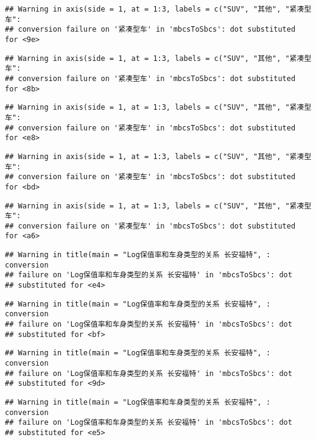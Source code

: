 \documentclass[]{article}
\begin{document}
\begin{verbatim}
## Warning in axis(side = 1, at = 1:3, labels = c("SUV", "其他", "紧凑型车":
## conversion failure on '紧凑型车' in 'mbcsToSbcs': dot substituted for <9e>
\end{verbatim}

\begin{verbatim}
## Warning in axis(side = 1, at = 1:3, labels = c("SUV", "其他", "紧凑型车":
## conversion failure on '紧凑型车' in 'mbcsToSbcs': dot substituted for <8b>
\end{verbatim}

\begin{verbatim}
## Warning in axis(side = 1, at = 1:3, labels = c("SUV", "其他", "紧凑型车":
## conversion failure on '紧凑型车' in 'mbcsToSbcs': dot substituted for <e8>
\end{verbatim}

\begin{verbatim}
## Warning in axis(side = 1, at = 1:3, labels = c("SUV", "其他", "紧凑型车":
## conversion failure on '紧凑型车' in 'mbcsToSbcs': dot substituted for <bd>
\end{verbatim}

\begin{verbatim}
## Warning in axis(side = 1, at = 1:3, labels = c("SUV", "其他", "紧凑型车":
## conversion failure on '紧凑型车' in 'mbcsToSbcs': dot substituted for <a6>
\end{verbatim}

\begin{verbatim}
## Warning in title(main = "Log保值率和车身类型的关系 长安福特", : conversion
## failure on 'Log保值率和车身类型的关系 长安福特' in 'mbcsToSbcs': dot
## substituted for <e4>
\end{verbatim}

\begin{verbatim}
## Warning in title(main = "Log保值率和车身类型的关系 长安福特", : conversion
## failure on 'Log保值率和车身类型的关系 长安福特' in 'mbcsToSbcs': dot
## substituted for <bf>
\end{verbatim}

\begin{verbatim}
## Warning in title(main = "Log保值率和车身类型的关系 长安福特", : conversion
## failure on 'Log保值率和车身类型的关系 长安福特' in 'mbcsToSbcs': dot
## substituted for <9d>
\end{verbatim}

\begin{verbatim}
## Warning in title(main = "Log保值率和车身类型的关系 长安福特", : conversion
## failure on 'Log保值率和车身类型的关系 长安福特' in 'mbcsToSbcs': dot
## substituted for <e5>
\end{verbatim}
\end{document}

